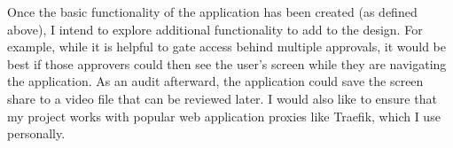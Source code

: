 \documentclass[12pt]{article}
\begin{document}
Once the basic functionality of the application has been created (as defined above), I intend to explore additional functionality to add to the design. For example, while it is helpful to gate access behind multiple approvals, it would be best if those approvers could then see the user's screen while they are navigating the application. As an audit afterward, the application could save the screen share to a video file that can be reviewed later. I would also like to ensure that my project works with popular web application proxies like Traefik, which I use personally.

\end{document}
